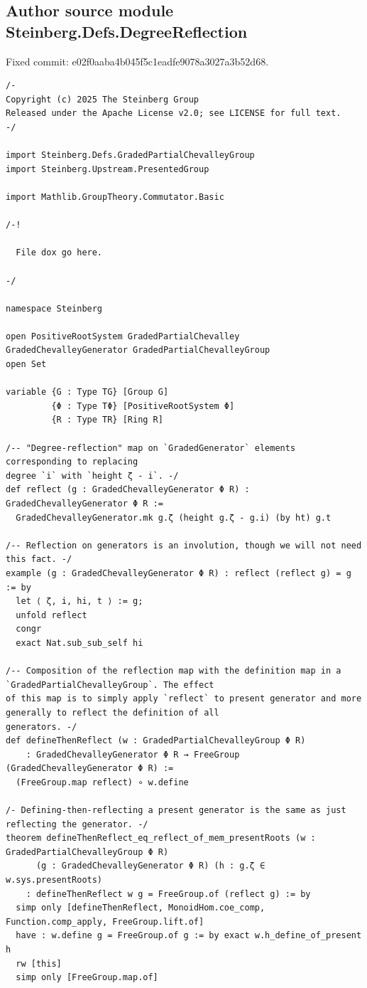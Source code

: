 \subsection*{Author source module Steinberg.Defs.DegreeReflection}
\noindent Fixed commit: e02f0aaba4b045f5c1eadfe9078a3027a3b52d68.
\begin{Verbatim}
/-
Copyright (c) 2025 The Steinberg Group
Released under the Apache License v2.0; see LICENSE for full text.
-/

import Steinberg.Defs.GradedPartialChevalleyGroup
import Steinberg.Upstream.PresentedGroup

import Mathlib.GroupTheory.Commutator.Basic

/-!

  File dox go here.

-/

namespace Steinberg

open PositiveRootSystem GradedPartialChevalley GradedChevalleyGenerator GradedPartialChevalleyGroup
open Set

variable {G : Type TG} [Group G]
         {Φ : Type TΦ} [PositiveRootSystem Φ]
         {R : Type TR} [Ring R]

/-- "Degree-reflection" map on `GradedGenerator` elements corresponding to replacing
degree `i` with `height ζ - i`. -/
def reflect (g : GradedChevalleyGenerator Φ R) : GradedChevalleyGenerator Φ R :=
  GradedChevalleyGenerator.mk g.ζ (height g.ζ - g.i) (by ht) g.t

/-- Reflection on generators is an involution, though we will not need this fact. -/
example (g : GradedChevalleyGenerator Φ R) : reflect (reflect g) = g := by
  let ⟨ ζ, i, hi, t ⟩ := g;
  unfold reflect
  congr
  exact Nat.sub_sub_self hi

/-- Composition of the reflection map with the definition map in a `GradedPartialChevalleyGroup`. The effect
of this map is to simply apply `reflect` to present generator and more generally to reflect the definition of all
generators. -/
def defineThenReflect (w : GradedPartialChevalleyGroup Φ R)
    : GradedChevalleyGenerator Φ R → FreeGroup (GradedChevalleyGenerator Φ R) :=
  (FreeGroup.map reflect) ∘ w.define

/- Defining-then-reflecting a present generator is the same as just reflecting the generator. -/
theorem defineThenReflect_eq_reflect_of_mem_presentRoots (w : GradedPartialChevalleyGroup Φ R)
      (g : GradedChevalleyGenerator Φ R) (h : g.ζ ∈ w.sys.presentRoots)
    : defineThenReflect w g = FreeGroup.of (reflect g) := by
  simp only [defineThenReflect, MonoidHom.coe_comp, Function.comp_apply, FreeGroup.lift.of]
  have : w.define g = FreeGroup.of g := by exact w.h_define_of_present h
  rw [this]
  simp only [FreeGroup.map.of]


\end{Verbatim}

